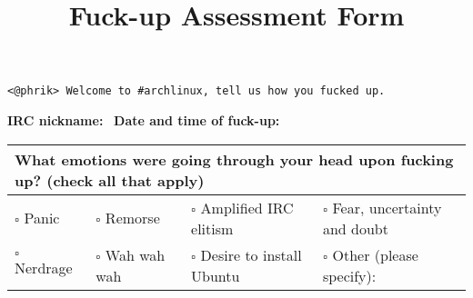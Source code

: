 \documentclass{article}
\title{Fuck-up Assessment Form} %
\author{}
\date{\vspace{-3.5em}}
\begin{document}
\maketitle

\begin{center}
\texttt{<@phrik> Welcome to \#archlinux, tell us how you fucked up.}
\end{center}

\vspace{1em}
\textbf{IRC nickname:} \dotfill
\ \textbf{Date and time of fuck-up:} \dotfill
\vspace{0.5em}

\def\arraystretch{1.5}  %
\begin{tabularx}{\textwidth}{|lllX|}
\hline
\multicolumn{4}{|l|}{\textbf{What emotions were going through your head upon fucking up?} (check all that apply)} \\ \hline
\(\square\) Panic &
\(\square\) Remorse &
\(\square\) Amplified IRC elitism &
\(\square\) Fear, uncertainty and doubt \\

\(\square\) Nerdrage &
\(\square\) Wah wah wah &
\(\square\) Desire to install Ubuntu &
\(\square\) Other (please specify): \dotfill \\ \hline
\end{tabularx}

\vspace{0.5em}

\newlength{\listenedwidth}
\newlength{\didntlistenwidth}
\settowidth{\listenedwidth}{I listened to}
\settowidth{\didntlistenwidth}{I didn't listen to}
\end{document}

